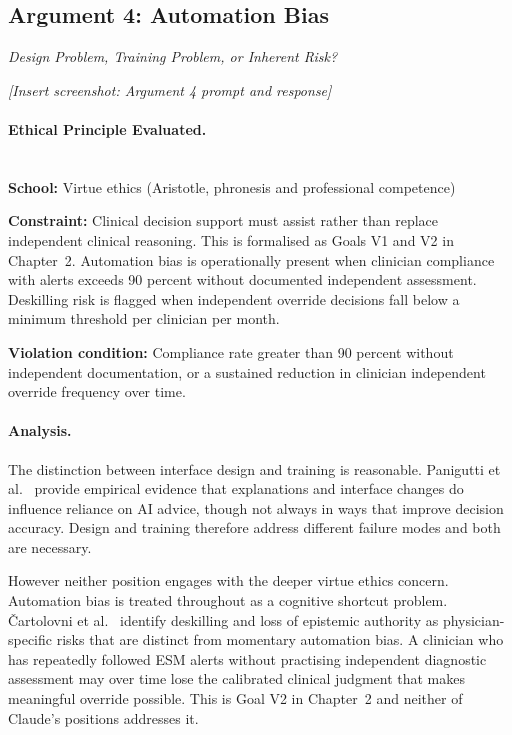 \documentclass[]{UCD_CS_41820_Report}
\begin{document}
\subsection*{Argument 4: Automation Bias}
\textit{Design Problem, Training Problem, or Inherent Risk?}

\noindent\textit{[Insert screenshot: Argument 4 prompt and response]}

\paragraph{Ethical Principle Evaluated.}~\\

\textbf{School:} Virtue ethics (Aristotle, phronesis and professional competence)

\textbf{Constraint:} Clinical decision support must assist rather than replace
independent clinical reasoning. This is formalised as Goals V1 and V2 in
Chapter~2. Automation bias is operationally present when clinician compliance with
alerts exceeds 90 percent without documented independent assessment. Deskilling
risk is flagged when independent override decisions fall below a minimum threshold
per clinician per month.

\textbf{Violation condition:} Compliance rate greater than 90 percent without
independent documentation, or a sustained reduction in clinician independent
override frequency over time.

\paragraph{Analysis.}

The distinction between interface design and training is reasonable. Panigutti
et al.\ \cite{panigutti2022} provide empirical evidence that explanations and
interface changes do influence reliance on AI advice, though not always in ways
that improve decision accuracy. Design and training therefore address different
failure modes and both are necessary.

However neither position engages with the deeper virtue ethics concern. Automation
bias is treated throughout as a cognitive shortcut problem. \v{C}artolovni et al.\
\cite{cartoloni2022} identify deskilling and loss of epistemic authority as
physician-specific risks that are distinct from momentary automation bias. A
clinician who has repeatedly followed ESM alerts without practising independent
diagnostic assessment may over time lose the calibrated clinical judgment that makes
meaningful override possible. This is Goal V2 in Chapter~2 and neither of Claude's
positions addresses it.
\end{document}
